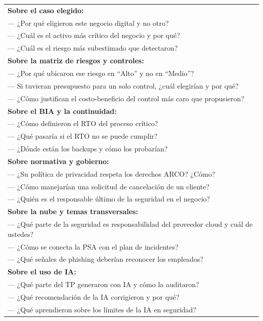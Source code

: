 \documentclass[12pt,a4paper]{article}
\renewcommand{\arraystretch}{1.25}
\begin{document}
\renewcommand{\arraystretch}{1.5}
\begin{tabularx}{\textwidth}{|X|}
\hline
\textbf{Sobre el caso elegido:}\\[2pt]
--- ¿Por qu\'e eligieron este negocio digital y no otro?\\
--- ¿Cu\'al es el activo m\'as cr\'itico del negocio y por qu\'e?\\
--- ¿Cu\'al es el riesgo m\'as subestimado que detectaron?\\
\hline
\textbf{Sobre la matriz de riesgos y controles:}\\[2pt]
--- ¿Por qu\'e ubicaron ese riesgo en ``Alto'' y no en ``Medio''?\\
--- Si tuvieran presupuesto para un solo control, ¿cu\'al elegir\'ian y por qu\'e?\\
--- ¿C\'omo justifican el costo-beneficio del control m\'as caro que propusieron?\\
\hline
\textbf{Sobre el BIA y la continuidad:}\\[2pt]
--- ¿C\'omo definieron el RTO del proceso cr\'itico?\\
--- ¿Qu\'e pasar\'ia si el RTO no se puede cumplir?\\
--- ¿D\'onde est\'an los backups y c\'omo los probar\'ian?\\
\hline
\textbf{Sobre normativa y gobierno:}\\[2pt]
--- ¿Su pol\'itica de privacidad respeta los derechos ARCO? ¿C\'omo?\\
--- ¿C\'omo manejar\'ian una solicitud de cancelaci\'on de un cliente?\\
--- ¿Qui\'en es el responsable \'ultimo de la seguridad en el negocio?\\
\hline
\textbf{Sobre la nube y temas transversales:}\\[2pt]
--- ¿Qu\'e parte de la seguridad es responsabilidad del proveedor cloud y cu\'al de ustedes?\\
--- ¿C\'omo se conecta la PSA con el plan de incidentes?\\
--- ¿Qu\'e se\~nales de phishing deber\'ian reconocer los empleados?\\
\hline
\textbf{Sobre el uso de IA:}\\[2pt]
--- ¿Qu\'e parte del TP generaron con IA y c\'omo la auditaron?\\
--- ¿Qu\'e recomendaci\'on de la IA corrigieron y por qu\'e?\\
--- ¿Qu\'e aprendieron sobre los l\'imites de la IA en seguridad?\\
\hline
\end{tabularx}
\end{document}
